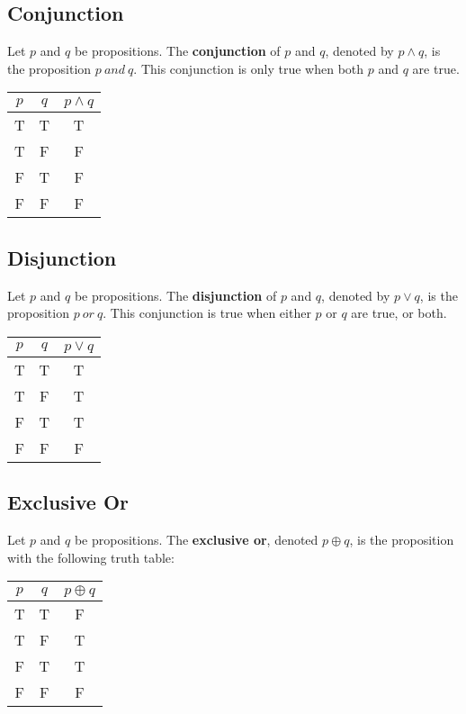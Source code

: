 \documentclass{math}
\begin{document}
\subsection*{Conjunction}
Let \( p \) and \( q \) be propositions. The \textbf{conjunction} of \( p \)
and \( q \), denoted by \( p \wedge q \), is the proposition \( p\ and\ q \).
This conjunction is only true when both \( p \) and \( q \) are true.
\begin{center}
  \begin{tabular}{|c|c|c|}
    \hline
    \( p \) & \( q \) & \( p \wedge q \) \\ \hline
    T       & T       & T \\ \hline
    T       & F       & F \\ \hline
    F       & T       & F \\ \hline
    F       & F       & F \\ \hline
  \end{tabular}
\end{center}

\subsection*{Disjunction}
Let \( p \) and \( q \) be propositions. The \textbf{disjunction} of \( p \)
and \( q \), denoted by \( p \vee q \), is the proposition \( p\ or\ q \).
This conjunction is true when either \( p \) or \( q \) are true, or both.
\begin{center}
  \begin{tabular}{|c|c|c|}
    \hline
    \( p \) & \( q \) & \( p \vee q \) \\ \hline
    T       & T       & T \\ \hline
    T       & F       & T \\ \hline
    F       & T       & T \\ \hline
    F       & F       & F \\ \hline
  \end{tabular}
\end{center}

\subsection*{Exclusive Or}
Let \( p \) and \( q \) be propositions. The \textbf{exclusive or}, denoted
\( p \oplus q \), is the proposition with the following truth table:
\begin{center}
  \begin{tabular}{|c|c|c|}
    \hline
    \( p \) & \( q \) & \( p \oplus q \) \\ \hline
    T       & T       & F \\ \hline
    T       & F       & T \\ \hline
    F       & T       & T \\ \hline
    F       & F       & F \\ \hline
  \end{tabular}
\end{center}
\end{document}
